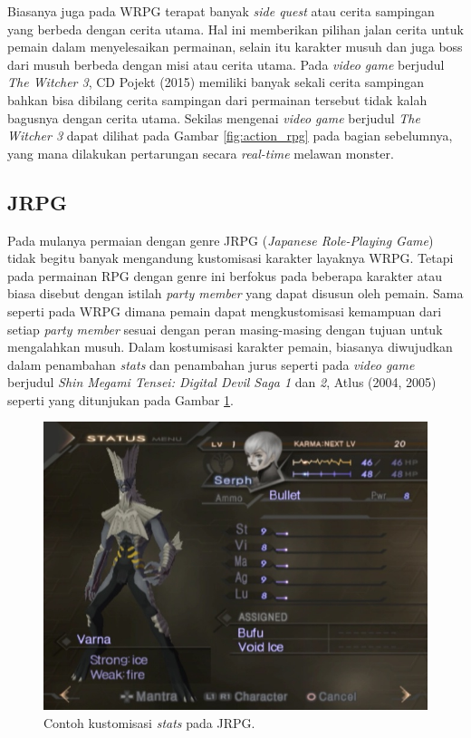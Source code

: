 \begin{subs}
	Biasanya juga pada WRPG terapat banyak \textit{side quest} atau cerita sampingan yang berbeda dengan cerita utama. Hal ini memberikan pilihan jalan cerita untuk pemain dalam menyelesaikan permainan, selain itu karakter musuh dan juga boss dari musuh berbeda dengan misi atau cerita utama. Pada \textit{video game} berjudul \textit{The Witcher 3}, CD Pojekt (2015) memiliki banyak sekali cerita sampingan bahkan bisa dibilang cerita sampingan dari permainan tersebut tidak kalah bagusnya dengan cerita utama. Sekilas mengenai \textit{video game} berjudul \textit{The Witcher 3} dapat dilihat pada Gambar \ref{fig:action_rpg} pada bagian sebelumnya, yang mana dilakukan pertarungan secara \textit{real-time} melawan monster.
	\vspace{1ex}
	
	\subsection{JRPG}
	\label{sec:sub_sec2_jrpg}
	
	Pada mulanya permaian dengan genre JRPG (\textit{Japanese Role-Playing Game}) tidak begitu banyak mengandung kustomisasi karakter layaknya WRPG. Tetapi pada permainan RPG dengan genre ini berfokus pada beberapa karakter atau biasa disebut dengan istilah \textit{party member} yang dapat disusun oleh pemain. Sama seperti pada WRPG dimana pemain dapat mengkustomisasi kemampuan dari setiap \textit{party member} sesuai dengan peran masing-masing dengan tujuan untuk mengalahkan musuh. Dalam kostumisasi karakter pemain, biasanya diwujudkan dalam penambahan \textit{stats} dan penambahan jurus seperti pada \textit{video game} berjudul \textit{Shin Megami Tensei: Digital Devil Saga 1} dan \textit{2}, Atlus (2004, 2005) seperti yang ditunjukan pada Gambar \ref{fig:dds}.
	\vspace{1ex}
	
	\begin{figure} [!h] \centering
		\includegraphics[scale=0.48]{img/dds.jpg}
		\caption{Contoh kustomisasi \textit{stats} pada JRPG.}
		\label{fig:dds}
	\end{figure}
	

\end{subs}
